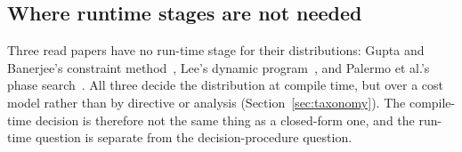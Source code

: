 \subsection{Where runtime stages are not needed}
Three read papers have no run-time stage for their distributions: Gupta and Banerjee's constraint method~\cite{gupta1992automatic}, Lee's dynamic program~\cite{lee1995techniques}, and Palermo et al.'s phase search~\cite{palermo1996dynamic}. All three decide the distribution at compile time, but over a cost model rather than by directive or analysis (Section~\ref{sec:taxonomy}). The compile-time decision is therefore not the same thing as a closed-form one, and the run-time question is separate from the decision-procedure question.
